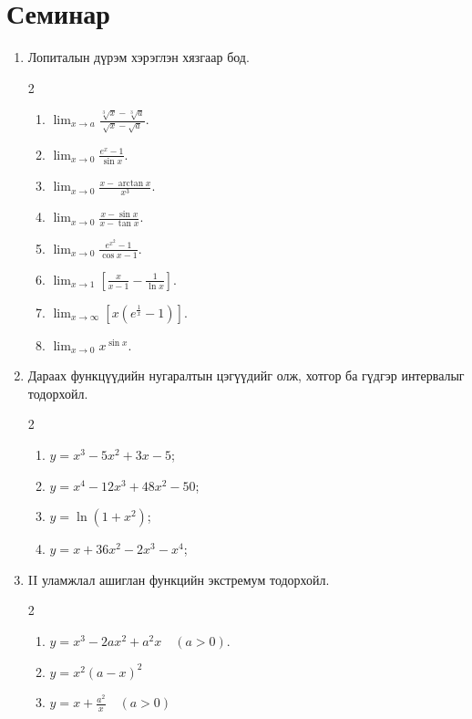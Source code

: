 \section{Семинар}
\begin{enumerate}
  \item Лопиталын дүрэм хэрэглэн хязгаар бод.
  \begin{multicols}{2}
\begin{enumerate}
  \item $\displaystyle\lim_{x\to a} \frac{\sqrt[3]{x}-\sqrt[3]{a}}{\sqrt{x}-\sqrt{a}}.$
 \item $ \displaystyle\lim_{x\to 0} \frac{e^{x}-1}{\sin x}.$
 \item $\displaystyle\lim_{x\to 0} \frac{x-\arctan x}{x^{3}}.$
 \item $\displaystyle \lim_{x\to 0} \frac{x-\sin x}{x-\tan x}.$ 
 \item $\displaystyle\lim_{x\to 0}  \frac{e^{x^{2}}-1}{\cos x - 1}.$
 \item $\displaystyle\lim_{x\to 1} 
     \left[\frac{x}{x-1}-\frac{1}{\ln x}\right].$
 \item $\displaystyle  \lim_{x\to \infty} 
     \left[x\left(e^{\frac{1}{x}}-1\right)\right].$
  \item $\displaystyle  \lim_{x\to 0} x^{\sin x}.$
 \end{enumerate} 
 \end{multicols}
 \item Дараах функцүүдийн нугаралтын
цэгүүдийг олж, хотгор ба гүдгэр
интервалыг тодорхойл.
\begin{multicols}{2}
 \begin{enumerate}
   \item $y = x^{3} - 5x^{2} + 3x - 5$;
  \item $y = x^{4} - 12x^{3} + 48x^{2} - 50$;
  \item $y = \ln(1+x^{2})$;
  \item $y = x + 36x^{2} - 2x^{3} - x^{4}$;
 \end{enumerate}
 \end{multicols}
\item II уламжлал ашиглан функцийн
экстремум тодорхойл.
\begin{multicols}{2}
\begin{enumerate}
   \item $y = x^3 - 2ax^2 + a^2x\quad (a>0)$.

\item $y = x^2(a - x)^2$

\item $y = x + \frac{a^2}{x}\quad (a>0)$


\end{enumerate}
\end{multicols}
\end{enumerate}

